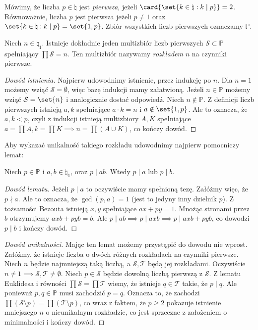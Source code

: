 \begin{definition}
	Mówimy, że liczba $p \in \natural$ jest \textit{pierwsza},
	jeżeli $\card{\set{k \in \natural : k \mid p}} = 2$.
	Równoważnie, liczba $p$ jest pierwsza jeżeli $p \neq 1$ oraz
	$\set{k \in \natural : k \mid p} = \set{1, p}$.
	Zbiór wszystkich liczb pierwszych oznaczamy $\mathbb P$.
\end{definition}

\begin{theorem}
	\label{nt:fundamentalne}
	Niech $n \in \natural_1$. Istnieje dokładnie jeden multizbiór
	liczb pierwszych $\mathcal S \subset \mathbb P$ spełniający
	$\prod \mathcal S = n$. Ten multizbiór nazywamy \textit{rozkładem} $n$ na czynniki pierwsze.
\end{theorem}

\begin{proof}[Dowód istnienia]
	Najpierw udowodnimy istnienie, przez indukcję po $n$.
	Dla $n = 1$ możemy wziąć $\mathcal S = \emptyset$, więc bazę indukcji mamy załatwioną.
	Jeżeli $n \in \mathbb P$ możemy wziąć $\mathcal S = \set{n}$ i analogicznie dostać odpowiedź.
	Niech $n \notin \mathbb P$. Z definicji liczb pierwszych istnieją $a, k$ spełniające
	$a \cdot k = n$ i $a \notin \set{1, p}$. Ale to oznacza, że $a, k < p$,
	czyli z indukcji istnieją multizbiory $A, K$ spełniające $a = \prod A, k = \prod K
		\implies n = \prod (A \cup K)$, co kończy dowód.
\end{proof}
Aby wykazać unikalność takiego rozkładu udowodnimy najpierw pomocniczy lemat:
\begin{lemma}
	\label{nt:lemateuklidesa}
	Niech $p \in \mathbb P$ i $a, b \in \natural_1$, oraz $p \mid ab$.
	Wtedy $p \mid a$ lub $p \mid b$.
\end{lemma}
\begin{proof}[Dowód lematu]
	Jeżeli $p \mid a$ to oczywiście mamy spełnioną tezę.
	Załóżmy więc, że $p \nmid a$.
	Ale to oznacza, że $\gcd(p, a) = 1$ (jest to jedyny inny dzielnik $p$).
	Z tożsamości Bezouta istnieją $x, y$ spełniające $ax + py = 1$.
	Mnożąc stronami przez $b$ otrzymujemy $axb + pyb = b$.
	Ale $p \mid ab \implies p \mid axb \implies p \mid axb+pyb$, co dowodzi
	$p \mid b$ i kończy dowód.
\end{proof}
\begin{proof}[Dowód unikalności]
	Mając ten lemat możemy przystąpić do dowodu nie wprost.
	Załóżmy, że istnieje liczba o dwóch różnych rozkładach na czynniki pierwsze.
	Niech $n$ będzie najmniejszą taką liczbą, a $\mathcal S, \mathcal T$ będą jej rozkładami.
	Oczywiście $n \neq 1 \implies \mathcal S, \mathcal T \neq \emptyset$.
	Niech $p \in \mathcal S$ będzie dowolną liczbą pierwszą z $\mathcal S$. Z lematu Euklidesa i
	równości $\prod \mathcal S = \prod \mathcal T$ wiemy, że istnieje $q \in \mathcal T$ takie, że $p \mid q$.
	Ale ponieważ $p, q\in \mathbb P$ musi zachodzić $p = q$.
	Oznacza to, że zachodzi $\prod (\mathcal S \setminus{p}) = \prod (\mathcal T \setminus{p})$, co wraz z faktem, że $p \geq 2$
	pokazuje istnienie mniejszego $n$ o nieunikalnym rozkładzie, co jest sprzeczne z założeniem
	o minimalności i kończy dowód.
\end{proof}
